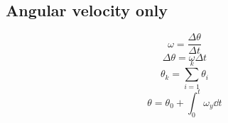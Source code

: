 \subsection{Angular velocity only}
\begin{equation}
    \omega = \frac{\Delta\theta}{\Delta t}
\end{equation}
\begin{equation}
    \Delta\theta = \omega\Delta t
\end{equation}
\begin{equation}
    \theta_k = \sum_{i = 1}^k \theta_i
\end{equation}
\begin{equation}
    \theta = \theta_0 + \int_0^t \omega_y \dd{t}
\end{equation}

